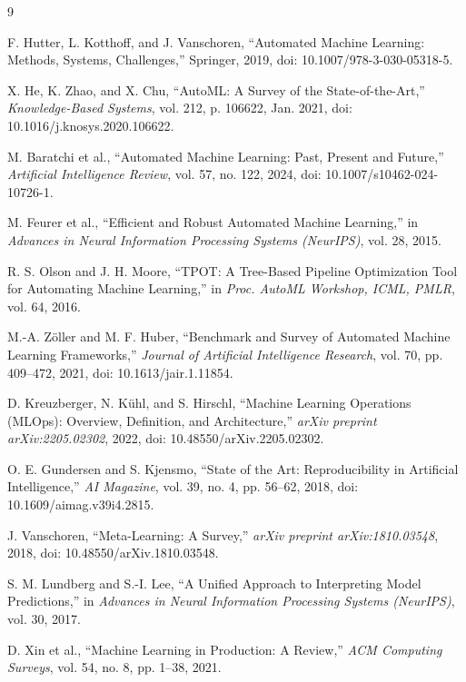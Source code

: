 \begin{thebibliography}{9}

F. Hutter, L. Kotthoff, and J. Vanschoren, ``Automated Machine Learning: Methods, Systems, Challenges,'' Springer, 2019, doi: 10.1007/978-3-030-05318-5.

X. He, K. Zhao, and X. Chu, ``AutoML: A Survey of the State-of-the-Art,'' \textit{Knowledge-Based Systems}, vol. 212, p. 106622, Jan. 2021, doi: 10.1016/j.knosys.2020.106622.

M. Baratchi et al., ``Automated Machine Learning: Past, Present and Future,'' \textit{Artificial Intelligence Review}, vol. 57, no. 122, 2024, doi: 10.1007/s10462-024-10726-1.

M. Feurer et al., ``Efficient and Robust Automated Machine Learning,'' in \textit{Advances in Neural Information Processing Systems (NeurIPS)}, vol. 28, 2015.

R. S. Olson and J. H. Moore, ``TPOT: A Tree-Based Pipeline Optimization Tool for Automating Machine Learning,'' in \textit{Proc. AutoML Workshop, ICML, PMLR}, vol. 64, 2016.

M.-A. Zöller and M. F. Huber, ``Benchmark and Survey of Automated Machine Learning Frameworks,'' \textit{Journal of Artificial Intelligence Research}, vol. 70, pp. 409–472, 2021, doi: 10.1613/jair.1.11854.

D. Kreuzberger, N. Kühl, and S. Hirschl, ``Machine Learning Operations (MLOps): Overview, Definition, and Architecture,'' \textit{arXiv preprint arXiv:2205.02302}, 2022, doi: 10.48550/arXiv.2205.02302.

O. E. Gundersen and S. Kjensmo, ``State of the Art: Reproducibility in Artificial Intelligence,'' \textit{AI Magazine}, vol. 39, no. 4, pp. 56–62, 2018, doi: 10.1609/aimag.v39i4.2815.

J. Vanschoren, ``Meta-Learning: A Survey,'' \textit{arXiv preprint arXiv:1810.03548}, 2018, doi: 10.48550/arXiv.1810.03548.

S. M. Lundberg and S.-I. Lee, ``A Unified Approach to Interpreting Model Predictions,'' in \textit{Advances in Neural Information Processing Systems (NeurIPS)}, vol. 30, 2017.

D. Xin et al., ``Machine Learning in Production: A Review,'' \textit{ACM Computing Surveys}, vol. 54, no. 8, pp. 1--38, 2021.


\end{thebibliography}
